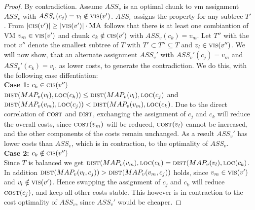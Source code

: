 \documentclass[9pt,twocolumn]{scrartcl}
\newcommand{\Chunk}{\ensuremath{c}}
\newcommand{\MaFactor}{\ensuremath{\textsc{MA}}}
\newcommand{\VmChunkAssignment}{\ensuremath{ASS_v}}
\newcommand{\NodeMapping}{\ensuremath{MAP_v}}
\newcommand{\ChunkLocation}{\ensuremath{\textsc{loc}}}
\newcommand{\VirtualNode}{\ensuremath{v}}
\newcommand{\SubstrateNode}{\ensuremath{v}}
\newcommand{\Tree}{\ensuremath{T}}
\begin{document}
\begin{proof}
 By contradiction. Assume $\VmChunkAssignment$ is an optimal chunk to vm
assignment $\VmChunkAssignment$ with $\VmChunkAssignment(\Chunk_j)
=\VirtualNode_l \notin \VmCount(\SubstrateNode')$. $\VmChunkAssignment$ assigns
the property for any subtree $\Tree'$. From $|\ChunkCount(\SubstrateNode')|
\geq
|\VmCount(\SubstrateNode')| \cdot \MaFactor$ follows that there is at least one
combiantion of
VM
$\VirtualNode_m \in \VmCount(\SubstrateNode')$ and chunk $\Chunk_k \notin
\ChunkCount(\SubstrateNode')$ with $\VmChunkAssignment(\Chunk_k) =
\VirtualNode_m$. Let $\Tree''$ with the root $\SubstrateNode''$ denote the
smallest subtree of $\Tree$ with $\Tree' \subset \Tree'' \subseteq \Tree$ and
$\VirtualNode_l \in \VmCount(\SubstrateNode'')$. We will now show, that an
alternate assignment $\VmChunkAssignment'$ with
$\VmChunkAssignment'(\Chunk_j) = \VirtualNode_m$ and
$\VmChunkAssignment'(\Chunk_k) = \VirtualNode_l$, as lower costs, to generate
the contradiction. We do this, with the following case diffentiation:
\\
\textbf{Case 1:} $\Chunk_k \in \ChunkCount(\SubstrateNode'')$\\
$\Distance(\NodeMapping(\VirtualNode_l), \ChunkLocation(\Chunk_k)) \leq
\Distance(\NodeMapping(\VirtualNode_l), \ChunkLocation(\Chunk_j)$ and
$\Distance(\NodeMapping(\VirtualNode_m), \ChunkLocation(\Chunk_j)) <
\Distance(\NodeMapping(\VirtualNode_m), \ChunkLocation(\Chunk_k)$. Due to the
direct correlation of $\textsc{cost}$ and $\textsc{dist}$, exchanging the
assignment of $\Chunk_j$ and $\Chunk_k$ will reduce the overall costs, since
$\CostPerChunk(\VirtualNode_m)$ will be reduced,
$\CostPerChunk(\VirtualNode_l)$ cannot be increased, and the other components
of the costs remain unchanged. As a result $\VmChunkAssignment'$ has lower
costs than $\VmChunkAssignment$, which is in contraction, to the optimality of
$\VmChunkAssignment$.\\
\textbf{Case 2:} $\Chunk_k \notin \ChunkCount(\SubstrateNode'')$\\
Since $\Tree$ is balanced we get $\Distance(\NodeMapping(\VirtualNode_m),
\ChunkLocation(\Chunk_k)  = \Distance(\NodeMapping(\VirtualNode_l),
\ChunkLocation(\Chunk_k)$. In addition $\Distance(\NodeMapping(\VirtualNode_l,
\Chunk_j)) > \Distance(\NodeMapping(\VirtualNode_m,
\Chunk_j)) $ holds, since $\VirtualNode_m \in \VmCount(\SubstrateNode')$ and
$\VirtualNode_l \notin
\VmCount(\SubstrateNode')$. Hence swapping the assignment of $\Chunk_j$ and
$\Chunk_k$ will reduce $\CostPerChunk(\Chunk_j)$, and keep all other costs
stable. This however is in contraction to the cost optimality of
$\VmChunkAssignment$, since $\VmChunkAssignment'$ would be cheaper.
\end{proof}
\end{document}
